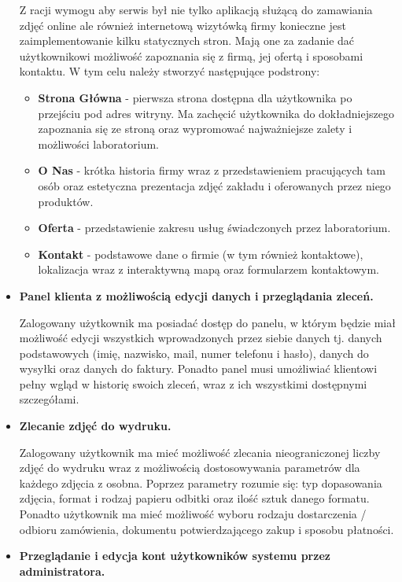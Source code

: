 \begin{itemize}
    Z racji wymogu aby serwis był nie tylko aplikacją służącą do zamawiania zdjęć online ale również internetową wizytówką firmy konieczne jest zaimplementowanie kilku statycznych stron. Mają one za zadanie dać użytkownikowi możliwość zapoznania się z firmą, jej ofertą i sposobami kontaktu. W tym celu należy stworzyć następujące podstrony:
    \begin{itemize}
        \item \textbf{Strona Główna} - pierwsza strona dostępna dla użytkownika po przejściu pod adres witryny. Ma zachęcić użytkownika do dokładniejszego zapoznania się ze stroną oraz wypromować najważniejsze zalety i możliwości laboratorium.
        \item \textbf{O Nas} - krótka historia firmy wraz z przedstawieniem pracujących tam osób oraz estetyczna prezentacja zdjęć zakładu i oferowanych przez niego produktów.
        \item \textbf{Oferta} - przedstawienie zakresu usług świadczonych przez laboratorium.
        \item \textbf{Kontakt} - podstawowe dane o firmie (w tym również kontaktowe), lokalizacja wraz z interaktywną mapą oraz formularzem kontaktowym.
    \end{itemize}
    
    \item \textbf{Panel klienta z możliwością edycji danych i przeglądania zleceń.}
    
    Zalogowany użytkownik ma posiadać dostęp do panelu, w którym będzie miał możliwość edycji wszystkich wprowadzonych przez siebie danych tj. danych podstawowych (imię, nazwisko, mail, numer telefonu i hasło), danych do wysyłki oraz danych do faktury. Ponadto panel musi umożliwiać klientowi pełny wgląd w historię swoich zleceń, wraz z ich wszystkimi dostępnymi szczegółami.
    
    \item \textbf{Zlecanie zdjęć do wydruku.}

    Zalogowany użytkownik ma mieć możliwość zlecania nieograniczonej liczby zdjęć do wydruku wraz z możliwością dostosowywania parametrów dla każdego zdjęcia z osobna. Poprzez parametry rozumie się: typ dopasowania zdjęcia, format i rodzaj papieru odbitki oraz ilość sztuk danego formatu. Ponadto użytkownik ma mieć możliwość wyboru rodzaju dostarczenia / odbioru zamówienia, dokumentu potwierdzającego zakup i sposobu płatności.
    
    \item \textbf{Przeglądanie i edycja kont użytkowników systemu przez administratora.}
    

\end{itemize}
